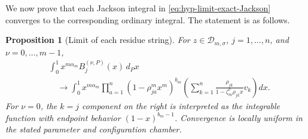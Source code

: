 \documentclass[12pt]{amsart}
\newtheorem{prop}[thm]{Proposition}
\theoremstyle{definition}
\numberwithin{equation}{section}
\theoremstyle{definition}
\let\mc\mathcal
\let\si\sigma
\def\beq{\begin{equation}}
\def\eeq{\end{equation}}
\begin{document}
We now prove that each Jackson integral in
\eqref{eq:hyp-limit-exact-Jackson} converges to the
corresponding ordinary integral. The statement is as follows.

\begin{prop}[Limit of each residue string]
\label{prop:hyp-string-limit}
For $z\in\mc D_{m,\si}$, $j=1,\ldots,n$, and
$\nu=0,\ldots,m-1$,
\beq\label{eq:hyp-string-integral-limit}
 \begin{aligned}
 &\int_0^1 x^{m\alpha_m}
       B_j^{(\nu,P)}(x)\,d_Px\\
 &\quad\longrightarrow
 \int_0^1 x^{m\alpha_m}
 \prod_{a=1}^n(1-\rho_{ja}^m x^m)^{b_m}
 \left(\sum_{k=1}^n
   \frac{\rho_{jk}}{1-\zeta_m^\nu\rho_{jk}x}v_k\right)dx.
 \end{aligned}
\eeq
For $\nu=0$, the $k=j$ component on the right is
interpreted as the integrable function with endpoint
behavior $(1-x)^{b_m-1}$. Convergence is locally
uniform in the stated parameter and configuration chamber.
\end{prop}
\end{document}
